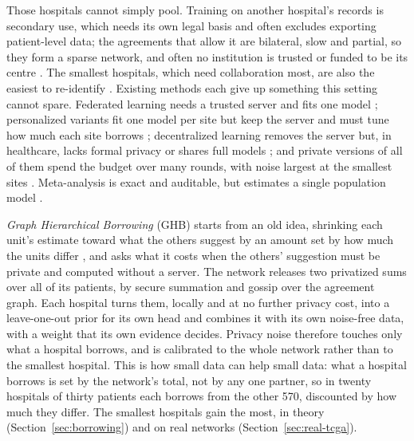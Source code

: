 \documentclass[acmsmall,screen,review]{acmart}
\theoremstyle{acmdefinition}
\begin{document}
Those hospitals cannot simply pool. Training on another hospital's records is secondary use, which needs its own legal basis and often excludes exporting patient-level data; the agreements that allow it are bilateral, slow and partial, so they form a sparse network, and often no institution is trusted or funded to be its centre \cite{cohen2018hipaa,ehds2025,gdpr2016,price2019privacy}. The smallest hospitals, which need collaboration most, are also the easiest to re-identify \cite{rocher2019estimating}. Existing methods each give up something this setting cannot spare. Federated learning needs a trusted server and fits one model \cite{mcmahan2017communication}; personalized variants fit one model per site but keep the server and must tune how much each site borrows \cite{li2021ditto}; decentralized learning removes the server but, in healthcare, lacks formal privacy or shares full models \cite{kalra2023decentralized,warnatherresthal2021swarm}; and private versions of all of them spend the budget over many rounds, with noise largest at the smallest sites \cite{bagdasaryan2019differential,mcmahan2018learning}. Meta-analysis is exact and auditable, but estimates a single population model \cite{dersimonian1986meta}.

\emph{Graph Hierarchical Borrowing} (GHB) starts from an old idea, shrinking each unit's estimate toward what the others suggest by an amount set by how much the units differ \cite{efron1973steins,stein1956inadmissibility}, and asks what it costs when the others' suggestion must be private and computed without a server. The network releases two privatized sums over all of its patients, by secure summation and gossip over the agreement graph. Each hospital turns them, locally and at no further privacy cost, into a leave-one-out prior for its own head and combines it with its own noise-free data, with a weight that its own evidence decides. Privacy noise therefore touches only what a hospital borrows, and is calibrated to the whole network rather than to the smallest hospital. This is how small data can help small data: what a hospital borrows is set by the network's total, not by any one partner, so in twenty hospitals of thirty patients each borrows from the other 570, discounted by how much they differ. The smallest hospitals gain the most, in theory (Section~\ref{sec:borrowing}) and on real networks (Section~\ref{sec:real-tcga}).
\end{document}
